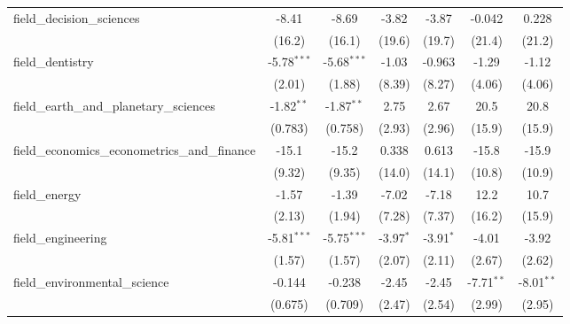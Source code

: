 \begin{tabular}{lcccccc}
   field\_decision\_sciences                                   & -8.41         & -8.69         & -3.82        & -3.87         & -0.042         & 0.228\\   
                                                               & (16.2)        & (16.1)        & (19.6)       & (19.7)        & (21.4)         & (21.2)\\   
   field\_dentistry                                            & -5.78$^{***}$ & -5.68$^{***}$ & -1.03        & -0.963        & -1.29          & -1.12\\   
                                                               & (2.01)        & (1.88)        & (8.39)       & (8.27)        & (4.06)         & (4.06)\\   
   field\_earth\_and\_planetary\_sciences                      & -1.82$^{**}$  & -1.87$^{**}$  & 2.75         & 2.67          & 20.5           & 20.8\\   
                                                               & (0.783)       & (0.758)       & (2.93)       & (2.96)        & (15.9)         & (15.9)\\   
   field\_economics\_econometrics\_and\_finance                & -15.1         & -15.2         & 0.338        & 0.613         & -15.8          & -15.9\\   
                                                               & (9.32)        & (9.35)        & (14.0)       & (14.1)        & (10.8)         & (10.9)\\   
   field\_energy                                               & -1.57         & -1.39         & -7.02        & -7.18         & 12.2           & 10.7\\   
                                                               & (2.13)        & (1.94)        & (7.28)       & (7.37)        & (16.2)         & (15.9)\\   
   field\_engineering                                          & -5.81$^{***}$ & -5.75$^{***}$ & -3.97$^{*}$  & -3.91$^{*}$   & -4.01          & -3.92\\   
                                                               & (1.57)        & (1.57)        & (2.07)       & (2.11)        & (2.67)         & (2.62)\\   
   field\_environmental\_science                               & -0.144        & -0.238        & -2.45        & -2.45         & -7.71$^{**}$   & -8.01$^{**}$\\   
                                                               & (0.675)       & (0.709)       & (2.47)       & (2.54)        & (2.99)         & (2.95)\\   

\end{tabular}
